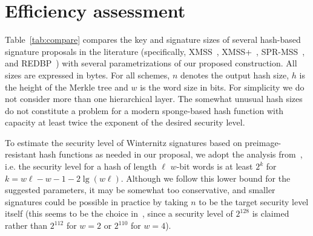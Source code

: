 \documentclass[11pt]{llncs}
\begin{document}
\section{Efficiency assessment}\label{sec:assess}

Table~\ref{tab:compare} compares the key and signature sizes of several hash-based signature proposals in the literature (specifically, XMSS~\cite{buchmann-dahmen-huelsing}, XMSS+~\cite{huelsing}, SPR-MSS~\cite{dahmen-okeya-takagi-vuillaume}, and REDBP~\cite{rohde-eisenbarth-dahmen-buchmann-paar}) with several parametrizations of our proposed construction. All sizes are expressed in bytes. For all schemes, $n$ denotes the output hash size, $h$ is the height of the Merkle tree and $w$ is the word size in bits. For simplicity we do not consider more than one hierarchical layer. The somewhat unusual hash sizes do not constitute a problem for a modern sponge-based hash function with capacity at least twice the exponent of the desired security level.

To estimate the security level of Winternitz signatures based on pre\-image-resistant hash functions as needed in our proposal, we adopt the analysis from~\cite[Section~5]{buchmann-dahmen-ereth-huelsing-rueckert}, i.e. the security level for a hash of length $\ell$ $w$-bit words is at least $2^k$ for $k = w\ell - w - 1 - 2\lg(w\ell)$. Although we follow this lower bound for the suggested parameters, it may be somewhat too conservative, and smaller signatures could be possible in practice by taking $n$ to be the target security level itself (this seems to be the choice in~\cite{rohde-eisenbarth-dahmen-buchmann-paar}, since a security level of $2^{128}$ is claimed rather than $2^{112}$ for $w = 2$ or $2^{110}$ for $w = 4$).
\end{document}
